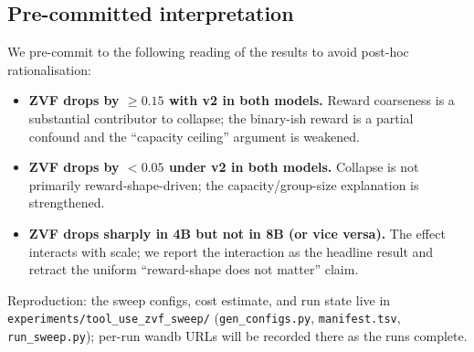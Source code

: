 \subsection{Pre-committed interpretation}
We pre-commit to the following reading of the results to avoid post-hoc
rationalisation:
\begin{itemize}
  \item \textbf{ZVF drops by \(\geq 0.15\) with v2 in both models.}
        Reward coarseness is a substantial contributor to collapse;
        the binary-ish reward is a partial confound and the
        ``capacity ceiling'' argument is weakened.
  \item \textbf{ZVF drops by \(<0.05\) under v2 in both models.}
        Collapse is not primarily reward-shape-driven; the
        capacity/group-size explanation is strengthened.
  \item \textbf{ZVF drops sharply in 4B but not in 8B (or vice versa).}
        The effect interacts with scale; we report the interaction as
        the headline result and retract the uniform ``reward-shape does
        not matter'' claim.
\end{itemize}

Reproduction: the sweep configs, cost estimate, and run state live in
\texttt{experiments/tool\_use\_zvf\_sweep/} (\texttt{gen\_configs.py},
\texttt{manifest.tsv}, \texttt{run\_sweep.py}); per-run wandb URLs will be
recorded there as the runs complete.

